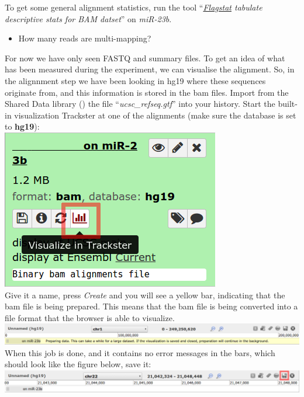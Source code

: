 To get some general alignment statistics, run the tool ``\textit{\underline{Flagstat} tabulate descriptive stats for BAM datset}'' on \textit{miR-23b}.
\begin{itemize}
	\item How many reads are multi-mapping?
\end{itemize}
For now we have only seen FASTQ and summary files. To get an idea of what has been measured during the experiment, we can visualise the alignment. So, in the alignnment step we have been looking in hg19 where these sequences originate from, and this information is stored in the bam files. Import from the Shared Data library (\datalibrarydirrnaseqadvanced) the file ``\textit{ucsc\_refseq.gtf}'' into your history. Start the built-in visualization Trackster at one of the alignments (make sure the database is set to \textbf{hg19}):\\
\includegraphics[scale=0.55]{figures/alignment_03}\\
Give it a name, press \textit{Create} and you will see a yellow bar, indicating that the bam file is being prepared. This means that the bam file is being converted into a file format that the browser is able to visualize.\\
\includegraphics[width=\textwidth]{figures/alignment_04.png}\\
When this job is done, and it contains no error messages in the bars, which should look like the figure below, save it:\\
\includegraphics[width=\textwidth]{figures/alignment_05.png}\\
